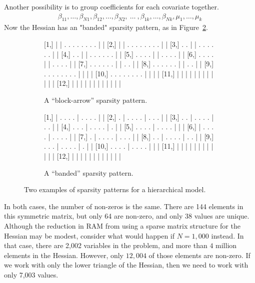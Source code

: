 \documentclass[jss]{jss}\usepackage[]{graphicx}\usepackage[]{color}
\begin{document}
Another possibility is to group coefficients for each covariate
together.
\begin{align}
\beta_{11},\dotsc,\beta_{N1},\beta_{12},\dotsc,\beta_{N2},~\dotsc~,\beta_{1k},\dotsc,\beta_{Nk},\mu_1,\dotsc,\mu_k
\end{align}
Now the Hessian has an "banded" sparsity pattern, as in Figure~\ref{fig:banded}.
\begin{figure}[tbp]
  \begin{subfigure}[b]{.5\textwidth}
\begin{Schunk}
\begin{Soutput}
                             
 [1,] | | . . . . . . . . | |
 [2,] | | . . . . . . . . | |
 [3,] . . | | . . . . . . | |
 [4,] . . | | . . . . . . | |
 [5,] . . . . | | . . . . | |
 [6,] . . . . | | . . . . | |
 [7,] . . . . . . | | . . | |
 [8,] . . . . . . | | . . | |
 [9,] . . . . . . . . | | | |
[10,] . . . . . . . . | | | |
[11,] | | | | | | | | | | | |
[12,] | | | | | | | | | | | |
\end{Soutput}
\end{Schunk}
\caption{A ``block-arrow'' sparsity pattern.}\label{fig:blockarrow}
\end{subfigure}
\begin{subfigure}[b]{.5\textwidth}
\begin{Schunk}
\begin{Soutput}
                             
 [1,] | . . . . | . . . . | |
 [2,] . | . . . . | . . . | |
 [3,] . . | . . . . | . . | |
 [4,] . . . | . . . . | . | |
 [5,] . . . . | . . . . | | |
 [6,] | . . . . | . . . . | |
 [7,] . | . . . . | . . . | |
 [8,] . . | . . . . | . . | |
 [9,] . . . | . . . . | . | |
[10,] . . . . | . . . . | | |
[11,] | | | | | | | | | | | |
[12,] | | | | | | | | | | | |
\end{Soutput}
\end{Schunk}
\caption{A ``banded'' sparsity pattern.}\label{fig:banded}
\end{subfigure}
\caption{Two examples of sparsity patterns for a hierarchical model.}\label{fig:patterns}
\end{figure}

In both cases, the number of non-zeros is the same.   There are
144 elements in this symmetric matrix, but only 64 are
non-zero, and only 38 values are unique.  Although the reduction in
RAM from using a sparse matrix structure for the Hessian may be
modest, consider what would happen if $N=1,000$ instead.  In that case,
there are 2,002 variables in the problem, and more than $4$ million
elements in the Hessian.  However, only $12,004$ of those elements are
non-zero.  If we work with only the lower triangle of the Hessian, then we need to work with
only 7,003 values.
\end{document}
